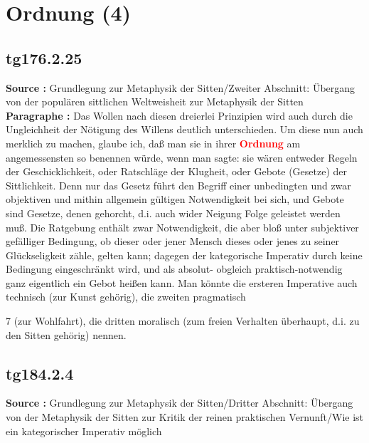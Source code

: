 \documentclass[a4paper,12pt,twoside]{book}
\newcommand{\match}[1]{\textcolor{red}{\textbf{#1}}}
\newcommand{\unnumberedsection}[1]{
	\section*{#1}
	\addcontentsline{toc}{section}{#1}
	\markright{#1}
}
\begin{document}
	\unnumberedsection{Ordnung (4)} 
	\subsection*{tg176.2.25} 
	\textbf{Source : }Grundlegung zur Metaphysik der Sitten/Zweiter Abschnitt: Übergang von der populären sittlichen Weltweisheit zur Metaphysik der Sitten\\  
	
	\noindent\textbf{Paragraphe : }Das Wollen nach diesen dreierlei Prinzipien wird auch durch die Ungleichheit der Nötigung des Willens deutlich unterschieden. Um diese nun auch merklich zu machen, glaube ich, daß man sie in ihrer \match{Ordnung} am angemessensten so benennen würde, wenn man sagte: sie wären entweder Regeln der Geschicklichkeit, oder Ratschläge der  Klugheit, oder Gebote (Gesetze) der Sittlichkeit. Denn nur das Gesetz führt den Begriff einer unbedingten und zwar objektiven und mithin allgemein gültigen Notwendigkeit bei sich, und Gebote sind Gesetze, denen gehorcht, d.i. auch wider Neigung Folge geleistet werden muß. Die Ratgebung enthält zwar Notwendigkeit, die aber bloß unter subjektiver gefälliger Bedingung, ob dieser oder jener Mensch dieses oder jenes zu seiner Glückseligkeit zähle, gelten kann; dagegen der kategorische Imperativ durch keine Bedingung eingeschränkt wird, und als absolut- obgleich praktisch-notwendig ganz eigentlich ein Gebot heißen kann. Man könnte die ersteren Imperative auch technisch (zur Kunst gehörig), die zweiten pragmatisch
	
	
	
	7
	(zur Wohlfahrt), die dritten moralisch (zum freien Verhalten überhaupt, d.i. zu den Sitten gehörig) nennen. 
	
	\subsection*{tg184.2.4} 
	\textbf{Source : }Grundlegung zur Metaphysik der Sitten/Dritter Abschnitt: Übergang von der Metaphysik der Sitten zur Kritik der reinen praktischen Vernunft/Wie ist ein kategorischer Imperativ möglich\\  
	
\end{document}
